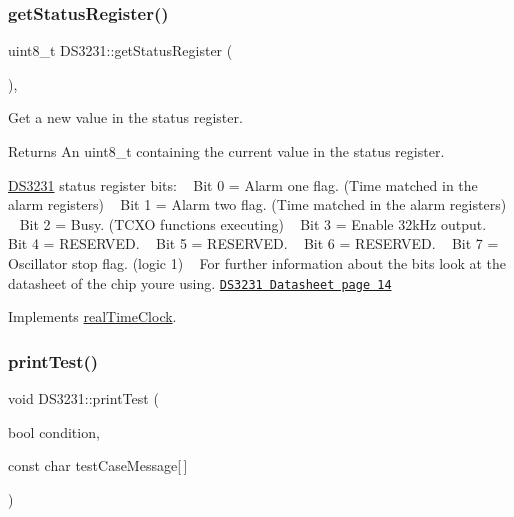 \subsubsection{\texorpdfstring{get\+Status\+Register()}{getStatusRegister()}}
{\footnotesize\ttfamily uint8\+\_\+t D\+S3231\+::get\+Status\+Register (\begin{DoxyParamCaption}{ }\end{DoxyParamCaption})\hspace{0.3cm}{\ttfamily [override]}, {\ttfamily [virtual]}}



Get a new value in the status register. 

\begin{DoxyReturn}{Returns}
An uint8\+\_\+t containing the current value in the status register.
\end{DoxyReturn}
\mbox{\hyperlink{class_d_s3231}{D\+S3231}} status register bits\+: ~\newline
 Bit 0 = Alarm one flag. (Time matched in the alarm registers) ~\newline
 Bit 1 = Alarm two flag. (Time matched in the alarm registers) ~\newline
 Bit 2 = Busy. (T\+C\+XO functions executing) ~\newline
 Bit 3 = Enable 32k\+Hz output. ~\newline
 Bit 4 = R\+E\+S\+E\+R\+V\+ED. ~\newline
 Bit 5 = R\+E\+S\+E\+R\+V\+ED. ~\newline
 Bit 6 = R\+E\+S\+E\+R\+V\+ED. ~\newline
 Bit 7 = Oscillator stop flag. (logic 1) ~\newline
 For further information about the bits look at the datasheet of the chip you\textquotesingle{}re using. \href{https://datasheets.maximintegrated.com/en/ds/DS3231.pdf}{\tt D\+S3231 Datasheet page 14} 

Implements \mbox{\hyperlink{classreal_time_clock_a38dcc51b0b30a5e480ea7f18f2c792ba}{real\+Time\+Clock}}.

\mbox{\label{class_d_s3231_a8cbc8aa68345b7d2b5a2a0615d207932}} 
\subsubsection{\texorpdfstring{print\+Test()}{printTest()}}
{\footnotesize\ttfamily void D\+S3231\+::print\+Test (\begin{DoxyParamCaption}\item[{bool}]{condition,  }\item[{const char}]{test\+Case\+Message\mbox{[}$\,$\mbox{]} }\end{DoxyParamCaption})\hspace{0.3cm}{\ttfamily [private]}}



